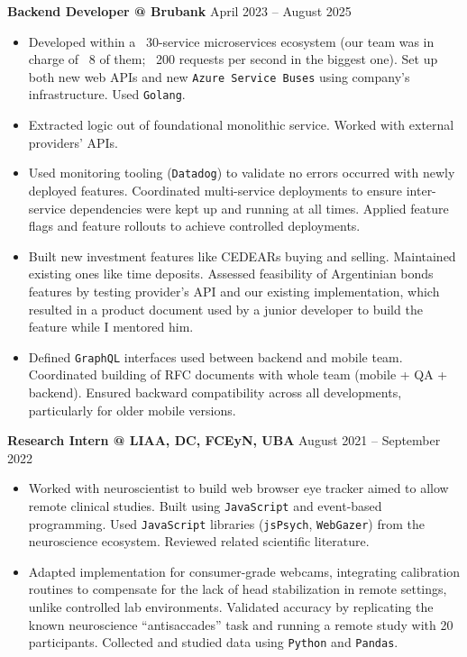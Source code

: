 \documentclass[a4paper]{article}
\begin{document}
\textbf{Backend Developer @ Brubank} \hfill April 2023 -- August 2025
\begin{itemize}
  \item Developed within a ~30-service microservices ecosystem (our team was in
    charge of ~8 of them; ~200 requests per second in the biggest one). Set up
    both new web APIs and new \texttt{Azure Service Buses} using company's
    infrastructure. Used \texttt{Golang}.
  \item Extracted logic out of foundational monolithic service. Worked with
    external providers' APIs.
  \item Used monitoring tooling (\texttt{Datadog}) to validate no errors occurred with
    newly deployed features. Coordinated multi-service deployments to ensure
    inter-service dependencies were kept up and running at all times. Applied
    feature flags and feature rollouts to achieve controlled deployments.
  \item Built new investment features like CEDEARs buying and selling.
    Maintained existing ones like time deposits. Assessed feasibility of
    Argentinian bonds features by testing provider's API and our existing
    implementation, which resulted in a product document used by a junior
    developer to build the feature while I mentored him.
  \item Defined \texttt{GraphQL} interfaces used between backend and mobile team.
    Coordinated building of RFC documents with whole team (mobile + QA +
    backend). Ensured backward compatibility across all developments,
    particularly for older mobile versions.
\end{itemize}

\textbf{Research Intern @ LIAA, DC, FCEyN, UBA} \hfill August 2021 -- September 2022
\begin{itemize}
  \item Worked with neuroscientist to build web browser eye tracker aimed to
    allow remote clinical studies. Built using \texttt{JavaScript} and event-based
    programming. Used \texttt{JavaScript} libraries (\texttt{jsPsych},
    \texttt{WebGazer}) from the neuroscience ecosystem. Reviewed related
    scientific literature.
  \item Adapted implementation for consumer-grade webcams, integrating
    calibration routines to compensate for the lack of head stabilization in
    remote settings, unlike controlled lab environments. Validated accuracy
    by replicating the known neuroscience ``antisaccades'' task and running a
    remote study with 20 participants. Collected and studied data using
    \texttt{Python} and \texttt{Pandas}.
\end{itemize}
\end{document}

